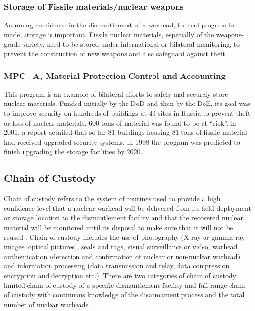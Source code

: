 \documentclass[twoside,titlepage,11pt,twocolumn,a4paper]{article}
\begin{document}
\subsubsection{Storage of Fissile materials/nuclear weapons}
Assuming confidence in the dismantlement of a warhead, for real
progress to made, storage is important. Fissile nuclear materials,
especially of the weapons-grade variety, need to be stored under
international or bilateral monitoring, to prevent the construction of
new weapons and also safeguard against theft.

\subsubsection{MPC+A, Material Protection Control and Accounting}
This program is an example of bilateral efforts to safely and securely
store nuclear materials. Funded initially by the DoD and then by the
DoE, its goal was to improve security on hundreds of buildings at 40
sites in Russia to prevent theft or loss of nuclear materials. 600
tons of material was found to be at ``risk''. in 2001, a report
detailed that so far 81 buildings housing 81 tons of fissile material
had received upgraded security systems. In 1998 the program was
predicted to finish upgrading the storage facilities by
2020. \citep{y12}

\subsection{Chain of Custody}
Chain of custody refers to the system of routines used to provide a
high confidence level that a nuclear warhead will be delivered from
its field deployment or storage location to the dismantlement facility
and that the recovered nuclear material will be monitored until its
disposal to make sure that it will not be reused
\citep{zarimpas2003}. Chain of custody includes the use of photography
(X-ray or gamma ray images, optical pictures), seals and tags, visual
surveillance or video, warhead authentication (detection and
confirmation of nuclear or non-nuclear warhead) and information
processing (data transmission and relay, data compression, encryption
and decryption etc.). There are two categories of chain of custody:
limited chain of custody of a specific dismantlement facility and full
range chain of custody with continuous knowledge of the disarmament
process and the total number of nuclear warheads. \citep{wuwen2004}
\end{document}
